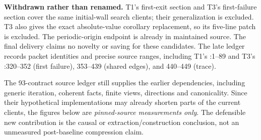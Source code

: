 \textbf{Withdrawn rather than renamed.} T1's first-exit section and T3's first-failure section cover the same initial-wall search clients; their generalization is excluded. T3 also gives the exact absolute-value corollary replacement, so its five-line patch is excluded. The periodic-origin endpoint is already in maintained source. The final delivery claims no novelty or saving for these candidates. The late ledger records packet identities and precise source ranges, including T1's :1--89 and T3's :320--352 (first failure), 353--439 (shared edges), and 440--449 (trace).

The 93-contract source ledger still supplies the earlier dependencies, including generic iteration, coherent facts, finite views, directions and canonicality. Since their hypothetical implementations may already shorten parts of the current clients, the figures below are \emph{pinned-source measurements only}. The defensible new contribution is the causal or extraction/construction conclusion, not an unmeasured post-baseline compression claim.
